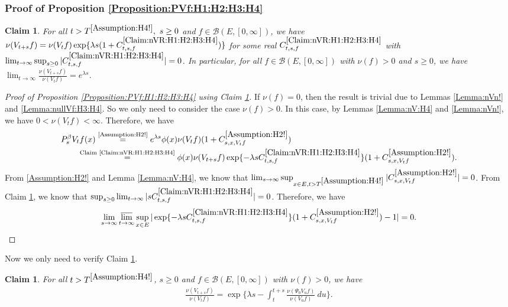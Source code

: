 \documentclass[12pt,a4paper]{amsart}
\numberwithin{equation}{section}
\theoremstyle{plain}
\newtheorem{claim}[thm]{Claim}
\theoremstyle{definition}
\theoremstyle{remark}
\newcounter{N}
\newcounter{n}[N]
\begin{document}
\subsubsection{Proof of Proposition \ref{Proposition:PVf:H1:H2:H3:H4}}
\label{sec:PVf}
\begin{claim} \label{Claim:nVR:H1:H2:H3:H4} 
For all $t> T^{\ref{Assumption:H4!}},~s \geq 0$ and $f\in \mathcal B(E,[0,\infty])$, we have $\nu(V_{t+s}f) = \nu(V_tf) \exp\{\lambda s (1+C^{\ref{Claim:nVR:H1:H2:H3:H4}}_{t,s,f}) \}$ for some real $C^{\ref{Claim:nVR:H1:H2:H3:H4}}_{t,s,f}$ with $\lim_{t\to \infty} \sup_{s\geq  0} |C^{\ref{Claim:nVR:H1:H2:H3:H4}}_{t,s,f}| = 0$.
In particular, for all $f\in \mathcal B(E,[0,\infty])$ with $\nu(f)>0$ and $s\geq 0$, we have $\lim_{t\to \infty} \frac{\nu(V_{t+s}f)}{\nu(V_tf)} = e^{\lambda s}$.
\end{claim}
\begin{proof}[{Proof of Proposition \ref{Proposition:PVf:H1:H2:H3:H4} using Claim \ref{Claim:nVR:H1:H2:H3:H4}}]
If $\nu(f) = 0$, then the result is trivial due to Lemmas \ref{Lemma:nVn!} and  \ref{Lemma:nullVf:H3:H4}.
So we only need to consider the case $\nu(f)>0$.
In this case, by Lemmas \ref{Lemma:nV:H4} and \ref{Lemma:nVn!}, we have $0<\nu(V_{t}f)<\infty$.
Therefore, we have
\begin{align}
\MoveEqLeft P_s^\beta V_t f(x)
\overset{\text{\ref{Assumption:H2!}}}= e^{\lambda s} \phi(x) \nu(V_tf) (1+C^{\ref{Assumption:H2!}}_{s,x,V_tf})
\\&\overset{\text{Claim \ref{Claim:nVR:H1:H2:H3:H4}}}= \phi(x) \nu(V_{t+s}f) \exp\{-\lambda s C^{\ref{Claim:nVR:H1:H2:H3:H4}}_{t,s,f}\} (1+C^{\ref{Assumption:H2!}}_{s,x,V_tf}).
\end{align}
From \ref{Assumption:H2!} and Lemma \ref{Lemma:nV:H4}, we know that $\lim_{s\to \infty} \sup_{x\in E, t> T^{\ref{Assumption:H4!}}} |C^{\ref{Assumption:H2!}}_{s,x,V_tf}| = 0$.
From Claim \ref{Claim:nVR:H1:H2:H3:H4}, we know that $\sup_{s\geq 0} \lim_{t\to \infty} |sC^{\ref{Claim:nVR:H1:H2:H3:H4}}_{t,s,f}| = 0$.
Therefore, we have \[\lim_{s\to \infty}\varlimsup_{t\to \infty}\sup_{x\in E}|\exp\{-\lambda s C^{\ref{Claim:nVR:H1:H2:H3:H4}}_{t,s,f}\} (1+C^{\ref{Assumption:H2!}}_{s,x,V_tf})-1| = 0. \qedhere\]
\end{proof}
Now we only need to verify Claim \ref{Claim:nVR:H1:H2:H3:H4}.
\begin{claim} \label{Claim:nVI:H4}
For all $t>T^{\ref{Assumption:H4!}}$, $s\geq 0$ and $f \in \mathcal B(E,[0,\infty])$ with $\nu(f)>0$, we have
\begin{align}
  \frac{\nu(V_{t+s} f)} {\nu(V_t f)}
  = \exp\Big\{ \lambda s - \int_t^{t+s} \frac{\nu(\Psi_0 V_u f) }{\nu(V_u f)} ~du\Big\}.
  \end{align}
\end{claim}
\end{document}
